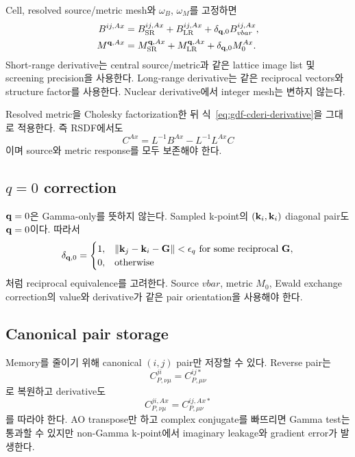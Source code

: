 Cell, resolved source/metric mesh와 $\omega_B$, $\omega_M$를 고정하면
\begin{align}
  B^{ij,Ax}
  &=B_{\mathrm{SR}}^{ij,Ax}
    +B_{\mathrm{LR}}^{ij,Ax}
    +\delta_{\mathbf{q},0}B_{vbar}^{ij,Ax},
  \label{eq:rsdf-source-derivative}\\
  M^{\mathbf{q},Ax}
  &=M_{\mathrm{SR}}^{\mathbf{q},Ax}
    +M_{\mathrm{LR}}^{\mathbf{q},Ax}
    +\delta_{\mathbf{q},0}M_0^{Ax}.
  \label{eq:rsdf-metric-derivative}
\end{align}
Short-range derivative는 central source/metric과 같은 lattice image list 및 screening
precision을 사용한다. Long-range derivative는 같은 reciprocal vectors와 structure
factor를 사용한다. Nuclear derivative에서 integer mesh는 변하지 않는다.

Resolved metric을 Cholesky factorization한 뒤 식~\eqref{eq:gdf-cderi-derivative}을
그대로 적용한다. 즉 RSDF에서도
\begin{equation}
  C^{Ax}=L^{-1}B^{Ax}-L^{-1}L^{Ax}C
  \label{eq:rsdf-cderi-derivative}
\end{equation}
이며 source와 metric response를 모두 보존해야 한다.

\subsection{\texorpdfstring{$q=0$}{q=0} correction}

$\mathbf{q}=0$은 Gamma-only를 뜻하지 않는다. Sampled k-point의 $(\mathbf{k}_i,\mathbf{k}_i)$ diagonal pair도
$\mathbf{q}=0$이다. 따라서
\begin{equation}
  \delta_{\mathbf{q},0}
  =\begin{cases}
    1,&\|\mathbf{k}_j-\mathbf{k}_i-\mathbf{G}\|<\epsilon_q\ \text{for some reciprocal }\mathbf{G},\\
    0,&\text{otherwise}
   \end{cases}
  \label{eq:rsdf-qzero-test}
\end{equation}
처럼 reciprocal equivalence를 고려한다. Source $vbar$, metric $M_0$, Ewald exchange
correction의 value와 derivative가 같은 pair orientation을 사용해야 한다.

\subsection{Canonical pair storage}

Memory를 줄이기 위해 canonical $(i,j)$ pair만 저장할 수 있다. Reverse pair는
\begin{equation}
  C_{P,\nu\mu}^{ji}
  =C_{P,\mu\nu}^{ij *}
  \label{eq:rsdf-reverse-pair}
\end{equation}
로 복원하고 derivative도
\begin{equation}
  C_{P,\nu\mu}^{ji,Ax}
  =C_{P,\mu\nu}^{ij,Ax *}
  \label{eq:rsdf-reverse-pair-derivative}
\end{equation}
를 따라야 한다. AO transpose만 하고 complex conjugate를 빠뜨리면 Gamma test는 통과할
수 있지만 non-Gamma k-point에서 imaginary leakage와 gradient error가 발생한다.

